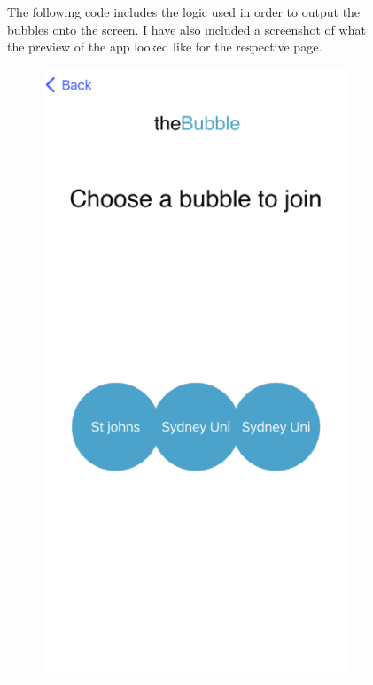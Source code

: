 \documentclass[a4paper, 11pt]{report}
\begin{document}
\begin{figure}
The following code includes the logic used in order to output the bubbles onto the screen. I have also included a screenshot of what the preview of the app looked like for the respective page.

\begin{subfigure}[h]{0.3\textwidth}
  \includegraphics[width=\textwidth]{preview.png}

\end{subfigure}
\end{figure}
\end{document}
